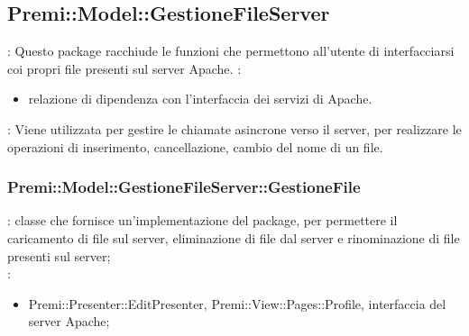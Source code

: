 \subsection{Premi::Model::GestioneFileServer} {
   	\textbf{\tipo}: Questo package racchiude le funzioni che permettono all'utente di interfacciarsi coi propri file presenti sul server Apache.
   	\textbf{\relaz}:
   	\begin{itemize}
   		\item relazione di dipendenza con l'interfaccia dei servizi di Apache.
   	\end{itemize}
   	\textbf{\interfacce}: Viene utilizzata per gestire le chiamate asincrone verso il server, per realizzare le operazioni di inserimento, cancellazione, cambio del nome di un file.\\
	
	\subsubsection{Premi::Model::GestioneFileServer::GestioneFile}{
		\textbf{\tipo}: classe che fornisce un'implementazione del package, per permettere il caricamento di file sul server, eliminazione di file dal server e rinominazione di file presenti sul server; \\
		\textbf{\relaz}:
		\begin{itemize}
			\item Premi::Presenter::EditPresenter, Premi::View::Pages::Profile, interfaccia del server Apache;
		\end{itemize}
	}
}

